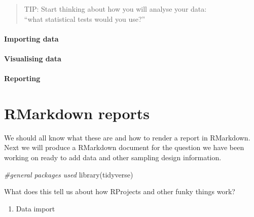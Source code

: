 \documentclass[
]{book}
\newenvironment{Shaded}{\begin{snugshade}}{\end{snugshade}}
\newcommand{\CommentTok}[1]{\textcolor[rgb]{0.56,0.35,0.01}{\textit{#1}}}
\newcommand{\FunctionTok}[1]{\textcolor[rgb]{0.00,0.00,0.00}{#1}}
\newcommand{\NormalTok}[1]{#1}
\providecommand{\tightlist}{%
  \setlength{\itemsep}{0pt}\setlength{\parskip}{0pt}}
\begin{document}
\begin{quote}
TIP: Start thinking about how you will analyse your data:\\
``what statistical tests would you use?''
\end{quote}

\hypertarget{importing-data}{%
\subsubsection{Importing data}\label{importing-data}}

\hypertarget{visualising-data}{%
\subsubsection{Visualising data}\label{visualising-data}}

\hypertarget{reporting}{%
\subsubsection{Reporting}\label{reporting}}

\hypertarget{rmarkdown-reports}{%
\chapter{RMarkdown reports}\label{rmarkdown-reports}}

We should all know what these are and how to render a report in RMarkdown. Next we will produce a RMarkdown document for the question we have been working on ready to add data and other sampling design information.

\begin{Shaded}
\begin{Highlighting}[]
\CommentTok{\#general packages used}
\FunctionTok{library}\NormalTok{(tidyverse)}
\end{Highlighting}
\end{Shaded}

What does this tell us about how RProjects and other funky things work?

\begin{enumerate}
\def\labelenumi{\arabic{enumi}.}
\setcounter{enumi}{2}
\tightlist
\item
  Data import
\end{enumerate}
\end{document}
